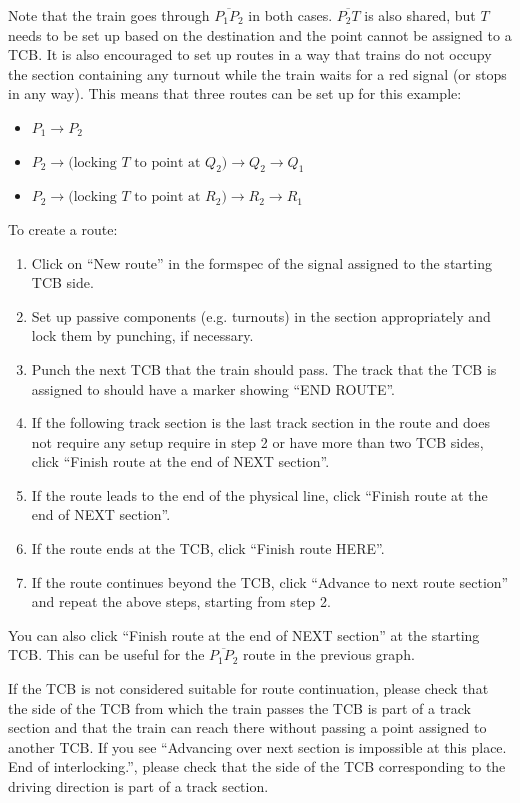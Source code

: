 \documentclass[notitlepage]{article}
\begin{document}
Note that the train goes through $\overline{P_{1}P_{2}}$ in both cases. $\overline{P_{2}T}$ is also shared, but $T$ needs to be set up based on the destination and the point cannot be assigned to a TCB. It is also encouraged to set up routes in a way that trains do not occupy the section containing any turnout while the train waits for a red signal (or stops in any way). This means that three routes can be set up for this example:
\begin{itemize}
\item $P_{1} \to P_{2}$
\item \(P_{2} \to \text{(locking $T$ to point at $Q_{2}$)} \to Q_{2} \to Q_{1}\)
\item \(P_{2} \to \text{(locking $T$ to point at $R_{2}$)} \to R_{2} \to R_{1}\)
\end{itemize}

To create a route:
\begin{enumerate}
\item Click on ``New route'' in the formspec of the signal assigned to the starting TCB side.
\item Set up passive components (e.g. turnouts) in the section appropriately and lock them by punching, if necessary.
\item Punch the next TCB that the train should pass. The track that the TCB is assigned to should have a marker showing ``END ROUTE''.
\item If the following track section is the last track section in the route and does not require any setup require in step 2 or have more than two TCB sides, click ``Finish route at the end of NEXT section''.
\item If the route leads to the end of the physical line, click ``Finish route at the end of NEXT section''.
\item If the route ends at the TCB, click ``Finish route HERE''.
\item If the route continues beyond the TCB, click ``Advance to next route section'' and repeat the above steps, starting from step 2.
\end{enumerate}

You can also click ``Finish route at the end of NEXT section'' at the starting TCB. This can be useful for the $\overline{P_1P_2}$ route in the previous graph.

If the TCB is not considered suitable for route continuation, please check that the side of the TCB from which the train passes the TCB is part of a track section and that the train can reach there without passing a point assigned to another TCB. If you see ``Advancing over next section is impossible at this place. End of interlocking.'', please check that the side of the TCB corresponding to the driving direction is part of a track section.
\end{document}
